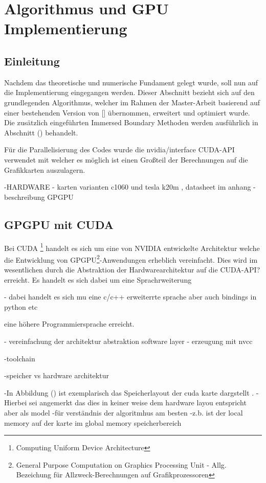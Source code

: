 \chapter{Algorithmus und GPU Implementierung}

\section{Einleitung}

Nachdem das theoretische und numerische Fundament gelegt wurde, soll nun auf die Implementierung  eingegangen werden.
Dieser Abschnitt bezieht sich auf den grundlegenden Algorithmus, welcher im Rahmen der Master-Arbeit basierend auf einer bestehenden
Version von [] übernommen, erweitert und optimiert wurde.
Die zusätzlich eingeführten  Immersed Boundary Methoden werden ausführlich in Abschnitt () behandelt.

Für die Parallelisierung  des Codes wurde die nvidia/interface CUDA-API verwendet mit welcher es möglich ist einen Großteil der Berechnungen
auf die Grafikkarten auszulagern.

-HARDWARE - karten varianten c1060 und tesla k20m , datasheet im anhang
-beschreibung GPGPU


\section{GPGPU mit CUDA}

Bei CUDA \footnote{Computing Uniform Device Architecture} handelt es sich um eine von NVIDIA entwickelte Architektur welche die
Entwicklung von GPGPU\footnote{General Purpose Computation on Graphics Processing Unit - Allg.
Bezeichung für Allzweck-Berechnungen auf Grafikprozessoren}-Anwendungen erheblich vereinfacht.
Dies wird im wesentlichen durch die Abstraktion der Hardwarearchitektur auf die CUDA-API? erreicht.
Es handelt es sich dabei um eine Sprachrweiterung

- dabei handelt es sich mu eine c/c++ erweiterrte sprache aber auch bindings in python etc



 eine höhere Programmiersprache erreicht.

- vereinfachung  der architektur abstraktion software layer
- erzeugung mit nvcc

-toolchain

-speicher vs hardware architektur



-In Abbildung () ist exemplarisch das Speicherlayout der cuda karte dargstellt .
-Hierbei sei angemerkt das dies in keiner weise dem hardware layou entspricht aber als model
-für verständnis der algoritmhus am besten
-z.b. ist der local memory auf der karte im global memory speicherbereich

